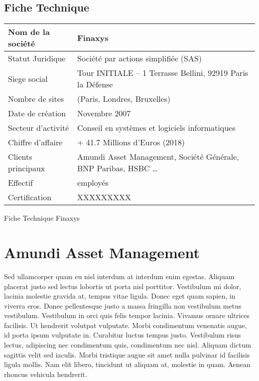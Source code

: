 \subsection{Fiche Technique}

\def\arraystretch{1.8}
\begin{center}
    \begin{tabularx}{0.8\textwidth} { 
        | >{\raggedright\arraybackslash}X
        | >{\centering\arraybackslash}X | }
    \hline
    Nom de la société   &   Finaxys \\
    \hline
    Statut Juridique    &   Société par actions simplifiée (SAS) \\
    \hline
    Siege social        &   Tour INITIALE – 1 Terrasse Bellini,  92919 Paris la Défense  \\
    \hline
    Nombre de sites     &   3 (Paris, Londres, Bruxelles) \\
    \hline
    Date de création    &   Novembre 2007  \\
    \hline
    Secteur d’activité  &   Conseil en systèmes et logiciels informatiques  \\
    \hline
    Chiffre d’affaire   &   + 41.7 Millions d'Euros (2018)  \\
    \hline
    Clients principaux  &   Amundi Asset Management, Société Générale, BNP Paribas, HSBC \dots  \\
    \hline
    Effectif            &   350 employés\\
    \hline
    Certification       &   XXXXXXXXX  \\
    \hline
    \end{tabularx}
    \begin{table}[htp]
        \caption{Fiche Technique Finaxys}
    \end{table}
\end{center}

\section{Amundi Asset Management}

Sed ullamcorper quam eu nisl interdum at interdum enim egestas. Aliquam placerat justo sed lectus lobortis ut porta nisl porttitor. Vestibulum mi dolor, lacinia molestie gravida at, tempus vitae ligula. Donec eget quam sapien, in viverra eros. Donec pellentesque justo a massa fringilla non vestibulum metus vestibulum. Vestibulum in orci quis felis tempor lacinia. Vivamus ornare ultrices facilisis. Ut hendrerit volutpat vulputate. Morbi condimentum venenatis augue, id porta ipsum vulputate in. Curabitur luctus tempus justo. Vestibulum risus lectus, adipiscing nec condimentum quis, condimentum nec nisl. Aliquam dictum sagittis velit sed iaculis. Morbi tristique augue sit amet nulla pulvinar id facilisis ligula mollis. Nam elit libero, tincidunt ut aliquam at, molestie in quam. Aenean rhoncus vehicula hendrerit.
